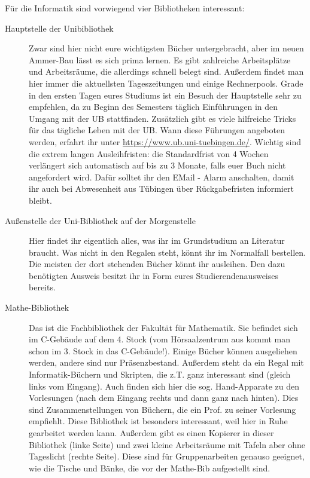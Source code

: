 Für die Informatik sind vorwiegend vier Bibliotheken interessant:
\begin{description}
	\item[Hauptstelle der Unibibliothek] Zwar sind hier nicht eure wichtigsten
	Bücher untergebracht, aber im neuen Ammer-Bau lässt es sich prima
	lernen. Es gibt zahlreiche Arbeitsplätze und Arbeitsräume, die
	allerdings schnell belegt sind. Außerdem findet man hier immer die
	aktuellsten Tageszeitungen und einige Rechnerpools.
	Grade in den ersten Tagen eures Studiums ist ein Besuch der Hauptstelle
	sehr zu empfehlen, da zu Beginn des Semesters täglich Einführungen in den Umgang mit der UB stattfinden. Zusätzlich gibt es viele hilfreiche Tricks für das tägliche Leben mit der UB. Wann diese Führungen angeboten werden, erfahrt ihr unter  \url{https://www.ub.uni-tuebingen.de/}. Wichtig sind die extrem langen Ausleihfristen: die Standardfrist von 4 Wochen verlängert sich automatisch auf bis zu 3 Monate, falls euer Buch nicht angefordert wird. Dafür solltet ihr den EMail - Alarm anschalten, damit ihr auch bei Abwesenheit aus Tübingen über Rückgabefristen informiert bleibt. 	%

	\item[Außenstelle der Uni-Bibliothek auf der Morgenstelle]
	Hier findet ihr eigentlich alles, was ihr im Grundstudium an
	Literatur braucht.  Was nicht in den Regalen steht, könnt ihr
	im Normalfall bestellen.  Die meisten der dort stehenden Bücher könnt ihr
	ausleihen. Den dazu benötigten Ausweis besitzt ihr in Form eures Studierendenausweises bereits.
	
	\item[Mathe-Bibliothek]
	Das ist die Fachbibliothek der Fakultät für Mathematik.  Sie
	befindet sich im C-Gebäude auf dem 4. Stock (vom
	Hörsaalzentrum aus kommt man schon im 3. Stock in das
	C-Gebäude!). Einige Bücher können ausgeliehen werden,
	andere sind nur Präsenzbestand.  Außerdem steht da ein Regal
	mit Informatik-Büchern und Skripten, die z.T. ganz
	interessant sind (gleich links vom Eingang).  Auch finden sich
	hier die sog. Hand-Apparate zu den Vorlesungen (nach dem
	Eingang rechts und dann ganz nach hinten).  Dies sind
	Zusammenstellungen von Büchern, die ein Prof. zu seiner
	Vorlesung empfiehlt.  Diese Bibliothek ist besonders
	interessant, weil hier in Ruhe gearbeitet werden kann.
	Außerdem gibt es einen Kopierer in dieser Bibliothek (linke
	Seite) und zwei kleine Arbeitsräume mit Tafeln aber ohne
	Tageslicht (rechte Seite).  Diese sind für Gruppenarbeiten
	genauso geeignet, wie die Tische und Bänke, die vor der
	Mathe-Bib aufgestellt sind.
	

\end{description}
